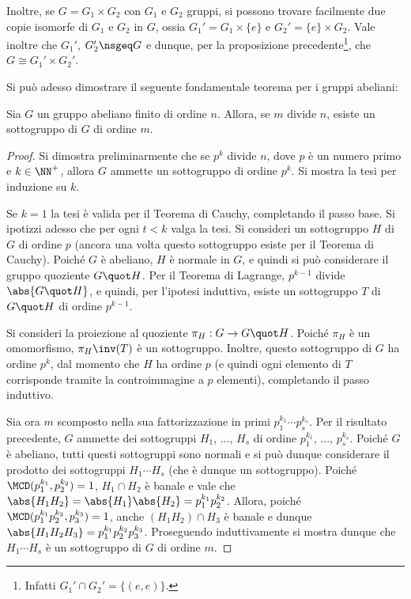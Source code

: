 \documentclass[12pt]{scrartcl}
\begin{document}
	
	Inoltre, se $G = G_1 \times G_2$ con $G_1$ e $G_2$ gruppi, si possono trovare
	facilmente due copie isomorfe di $G_1$ e $G_2$ in $G$, ossia $G_1' = G_1 \times \{e\}$ e $G_2' = \{e\} \times G_2$.
	Vale inoltre che $G_1'$, $G_2' \nsgeq G$ e dunque,
	per la proposizione precedente\footnote{Infatti $G_1' \cap G_2' = \{(e,e)\}$.}, che
	$G \cong G_1' \times G_2'$. \bigskip


	Si può adesso dimostrare il seguente fondamentale
	teorema per i gruppi abeliani:
	
	\begin{theorem}
		Sia $G$ un gruppo abeliano finito di ordine $n$.
		Allora, se $m$ divide $n$, esiste un sottogruppo di
		$G$ di ordine $m$.
	\end{theorem}

	\begin{proof}
		Si dimostra preliminarmente che se $p^k$ divide $n$,
		dove $p$ è un numero primo e $k \in \NN^+$, allora
		$G$ ammette un sottogruppo di ordine $p^k$. Si
		mostra la tesi per induzione su $k$. \medskip
		
		
		Se $k=1$ la tesi è valida per il Teorema di Cauchy, completando il passo base. Si ipotizzi adesso
		che per ogni $t < k$ valga la tesi. Si consideri
		un sottogruppo $H$ di $G$ di ordine $p$
		(ancora una volta questo sottogruppo esiste per il
		Teorema di Cauchy). Poiché $G$ è abeliano, $H$ è
		normale in $G$, e quindi si può considerare il
		gruppo quoziente $G \quot H$. Per il Teorema di
		Lagrange, $p^{k-1}$ divide $\abs{G \quot H}$, e
		quindi, per l'ipotesi induttiva, esiste un sottogruppo
		$T$ di $G \quot H$ di ordine $p^{k-1}$. \medskip
		
		
		Si consideri la proiezione al quoziente $\pi_H : G \to G \quot H$. Poiché $\pi_H$ è un omomorfismo,
		$\pi_H\inv(T)$ è un sottogruppo. Inoltre, questo sottogruppo di $G$ ha ordine $p^k$, dal momento che $H$ ha ordine $p$
		(e quindi ogni elemento di $T$ corrisponde tramite
		la controimmagine a $p$ elementi), completando il passo
		induttivo. \medskip
		
		
		Sia ora $m$ scomposto nella sua fattorizzazione in primi
		$p_1^{k_1} \cdots p_s^{k_s}$. Per il risultato precedente,
		$G$ ammette dei sottogruppi $H_1$, ..., $H_s$ di ordine
		$p_1^{k_1}$, ..., $p_s^{k_s}$. Poiché $G$ è abeliano,
		tutti questi sottogruppi sono normali e si può dunque
		considerare il prodotto dei sottogruppi $H_1 \cdots H_s$
		(che è dunque un sottogruppo). Poiché
		$\MCD(p_1^{k_1}, p_2^{k_2})=1$, $H_1 \cap H_2$ è banale e vale
		che $\abs{H_1 H_2} = \abs{H_1} \abs{H_2} = p_1^{k_1} p_2^{k_2}$.
		Allora, poiché $\MCD(p_1^{k_1} p_2^{k_2}, p_3^{k_3}) = 1$, anche $(H_1H_2) \cap H_3$ è banale e dunque $\abs{H_1 H_2 H_3} =
		p_1^{k_1} p_2^{k_2} p_3^{k_3}$. Proseguendo induttivamente
		si mostra dunque che $H_1 \cdots H_s$ è un sottogruppo
		di $G$ di ordine $m$.
	\end{proof}
\end{document}
